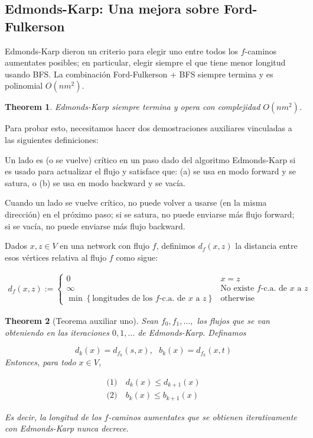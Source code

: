 \documentclass[a4paper]{article}
\newtheorem{theorem}{Theorem}
\newtheorem{theorem}{Theorem}
\begin{document}
\subsection{Edmonds-Karp: Una mejora sobre Ford-Fulkerson}

Edmonds-Karp dieron un criterio para elegir uno entre todos los $f$-caminos
aumentates posibles; en particular, elegir siempre el que tiene menor longitud
usando BFS. La combinación Ford-Fulkerson + BFS siempre termina y es polinomial
$O(nm^2)$.


\begin{theorem}
    Edmonds-Karp siempre termina y opera con complejidad $O(nm^2)$.
\end{theorem}

Para probar esto, necesitamos hacer dos demostraciones auxiliares vinculadas a las siguientes definiciones:

\begin{definition}
    Un lado es (o se vuelve) crítico en un paso dado del algoritmo Edmonds-Karp si es usado para actualizar el flujo y satisface que: (a) se usa en modo forward y se satura, o (b) se usa en modo backward y se vacía.
\end{definition}

Cuando un lado se vuelve crítico, no puede volver a usarse (en la misma
dirección) en el próximo paso; si se satura, no puede enviarse más flujo
forward; si se vacía, no puede enviarse más flujo backward.

\begin{definition}
    Dados $x, z \in V$  en una network con flujo $f$, definimos $d_{f}(x, z)$
    la distancia entre esos vértices relativa al flujo $f$ como sigue:

    \begin{align*}
        d_f(x, z) := \begin{cases}
            0 & x = z \\ 
            \infty &\text{No existe $f$-c.a. de $x$ a $z$} \\ 
            \min \left\{ \text{longitudes de los $f$-c.a. de $x$ a $z$} \right\} &\text{otherwise}
        \end{cases}
    \end{align*}
\end{definition}

\begin{theorem}[Teorema auxiliar uno]
    Sean $f_0, f_1, \ldots, $ los flujos que se van obteniendo en las
    iteraciones $0, 1, \ldots$ de Edmonds-Karp. Definamos 

    $$d_k(x) = d_{f_k}(s,x),  ~ ~ ~ b_k(x) = d_{f_k}(x, t)$$ Entonces, para todo $x \in V$,

    \begin{align*}
        \textit{(1)} &~d_k(x) \leq d_{k+1}(x) \\ 
        \textit{(2)} &~b_k(x) \leq b_{k+1}(x)
    \end{align*}

    Es decir, la longitud de los $f$-caminos aumentates que se obtienen
    iterativamente con Edmonds-Karp nunca decrece.
\end{theorem}
\end{document}
